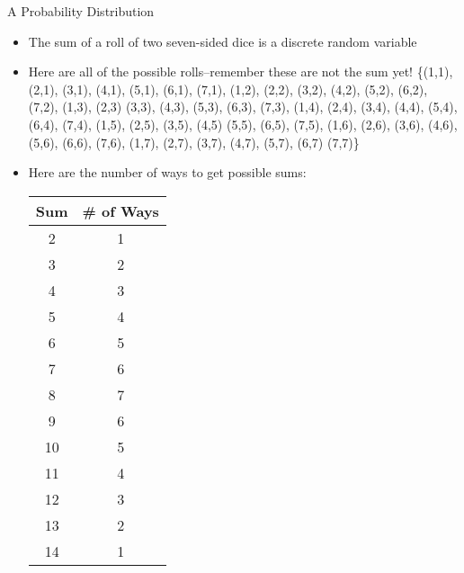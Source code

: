 \documentclass[xcolor=dvipsnames]{beamer}
\begin{document}
\begin{frame}{A Probability Distribution}
	\begin{itemize}
		\item The sum of a roll of two seven-sided dice is a discrete random variable \pause
		\item Here are all of the possible rolls--remember these are not the sum yet! \pause
		\{(1,1), (2,1), (3,1), (4,1), (5,1), (6,1), (7,1), (1,2), (2,2), (3,2), (4,2), (5,2), (6,2), (7,2), (1,3), (2,3)
		(3,3), (4,3), (5,3), (6,3), (7,3), (1,4), (2,4), (3,4), (4,4), (5,4), (6,4), (7,4), (1,5), (2,5), (3,5), (4,5)
		(5,5), (6,5), (7,5), (1,6), (2,6), (3,6), (4,6), (5,6), (6,6), (7,6), (1,7), (2,7), (3,7), (4,7), (5,7), (6,7)
		(7,7)\}
		\item Here are the number of ways to get possible sums:
		{ \tiny
		\begin{center}
			\begin{tabular}{|c|c|} \hline
					\textbf{Sum} & \textbf{\# of Ways} \\ \hline \hline
				      2 &    1\\ \hline
				     3  &   2\\ \hline
				     4  &   3\\ \hline
				     5  &   4\\ \hline
				     6  &   5\\ \hline
				     7  &   6\\ \hline
				     8  &   7\\ \hline
				     9  &   6\\ \hline
				    10  &   5\\ \hline
				    11  &   4\\ \hline
				    12  &   3\\ \hline
				    13  &   2\\ \hline
				    14  &   1\\ \hline
			\end{tabular}
		\end{center}}
	\end{itemize}
\end{frame}
\end{document}
